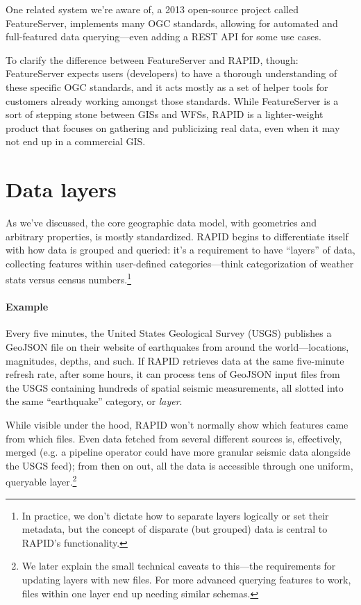 One related system we're aware of, a 2013 open-source project called FeatureServer, implements many OGC standards, allowing for automated and full-featured data querying---even adding a REST API for some use cases.

To clarify the difference between FeatureServer and RAPID, though: FeatureServer expects users (developers) to have a thorough understanding of these specific OGC standards, and it acts mostly as a set of helper tools for customers already working amongst those standards. While FeatureServer is a sort of stepping stone between GISs and WFSs, RAPID is a lighter-weight product that focuses on gathering and publicizing real data, even when it may not end up in a commercial GIS.


\section{Data layers}
\label{reqs_layers}
As we've discussed, the core geographic data model, with geometries and arbitrary properties, is mostly standardized. RAPID begins to differentiate itself with how data is grouped and queried: it's a requirement to have ``layers'' of data, collecting features within user-defined categories---think categorization of weather stats versus census numbers.\footnote{In practice, we don't dictate how to separate layers logically or set their metadata, but the concept of disparate (but grouped) data is central to RAPID's functionality.}

\paragraph{Example}
Every five minutes, the United States Geological Survey (USGS) publishes a GeoJSON file on their website of earthquakes from around the world---locations, magnitudes, depths, and such. If RAPID retrieves data at the same five-minute refresh rate, after some hours, it can process tens of GeoJSON input files from the USGS containing hundreds of spatial seismic measurements, all slotted into the same ``earthquake'' category, or \textit{layer}.

While visible under the hood, RAPID won't normally show which features came from which files. Even data fetched from several different sources is, effectively, merged (e.g. a pipeline operator could have more granular seismic data alongside the USGS feed); from then on out, all the data is accessible through one uniform, queryable layer.\footnote{We later explain the small technical caveats to this---the requirements for updating layers with new files. For more advanced querying features to work, files within one layer end up needing similar schemas.}


